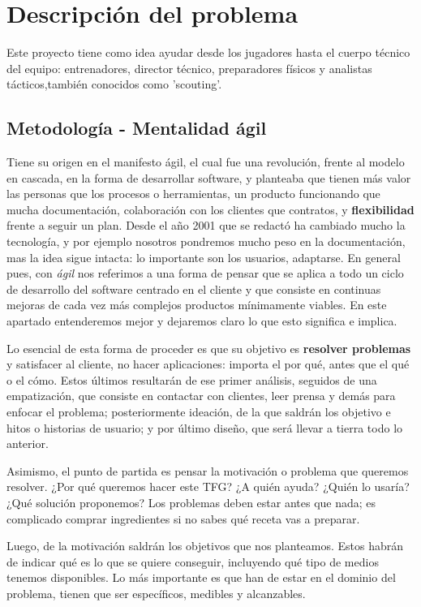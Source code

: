 \chapter{Descripción del problema}

Este proyecto tiene como idea ayudar desde los jugadores hasta 
el cuerpo técnico del equipo: entrenadores, director técnico, preparadores 
físicos y analistas tácticos,también conocidos como 'scouting'.

\section{Metodología - Mentalidad ágil}
Tiene su origen en el manifesto ágil\cite{manifesto-agil}, el cual fue una revolución, frente 
al modelo en cascada,
en la forma de desarrollar software, y planteaba que tienen más valor las personas que 
los procesos o herramientas, un producto funcionando que mucha documentación, colaboración 
con los clientes que contratos, y \textbf{flexibilidad} frente a seguir un plan. Desde el 
año 2001 que se redactó ha cambiado mucho la tecnología, y por ejemplo nosotros pondremos 
mucho peso en la documentación, mas la idea sigue intacta: lo importante son los usuarios, 
adaptarse. En general pues, con \textit{ágil} nos referimos a una forma de pensar que se aplica 
a todo un ciclo de desarrollo del software centrado en el cliente y que consiste en 
continuas mejoras de cada vez más complejos productos mínimamente viables\cite{agile-science}.
En este apartado entenderemos mejor y dejaremos claro lo que esto significa e implica.

Lo esencial de esta forma de proceder es que su objetivo es \textbf{resolver problemas} y satisfacer 
al cliente, no hacer aplicaciones: importa el por qué, antes que el qué o el cómo. Estos 
últimos resultarán de ese primer análisis, seguidos de una empatización, que consiste 
en contactar con clientes, leer prensa y demás para enfocar el problema; posteriormente 
ideación, de la que saldrán los objetivo e hitos o historias de usuario; y por último diseño, 
que será llevar a tierra todo lo anterior. 

Asimismo, el punto de partida es pensar la motivación o problema que queremos resolver. 
¿Por qué queremos hacer este TFG? ¿A quién ayuda? ¿Quién lo usaría? ¿Qué solución proponemos? 
Los problemas deben estar antes que nada; es complicado comprar ingredientes si no sabes qué 
receta vas a preparar. 

Luego, de la motivación saldrán los objetivos que nos planteamos. Estos habrán de indicar 
qué es lo que se quiere conseguir, incluyendo qué tipo de medios tenemos disponibles. Lo 
más importante es que han de estar en el dominio del problema, tienen que ser específicos, 
medibles y alcanzables\cite{objetivos}. 

